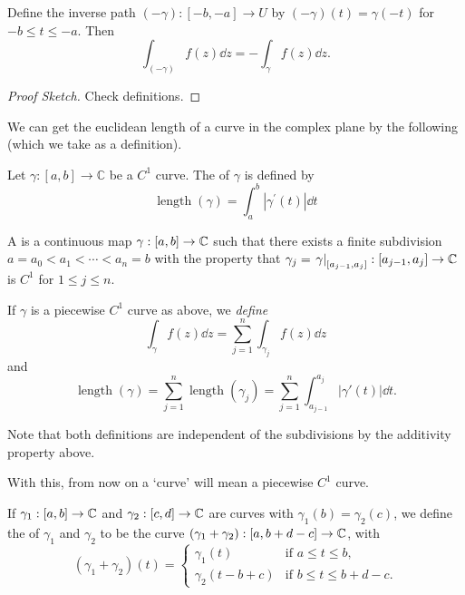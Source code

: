 \documentclass[a4paper]{scrartcl}
\begin{document}
\begin{proposition}
Define the inverse path $(-\gamma):[-b,-a] \rightarrow U$ by $(-\gamma)(t)=\gamma(-t)$ for $-b \leq t \leq-a$. Then
$$
\int_{(-\gamma)} f(z) \dd z=-\int_{\gamma} f(z) \dd z .
$$
\end{proposition}
\begin{proof}[Proof Sketch]    
    Check definitions.
\end{proof}

We can get the euclidean length of a curve in the complex plane by the following (which we take as a definition).

\begin{definition}
Let $\gamma:[a, b] \rightarrow \mathbb{C}$ be a $C^{1}$ curve. The  of $\gamma$ is defined by
$$
\operatorname{length}(\gamma)=\int_{a}^{b}\left|\gamma^{\prime}(t)\right| \dd t
$$
\end{definition}

\begin{definition}
    A  is a continuous map $\gamma: [a, b] \rightarrow \mathbb{C}$ such that there exists a finite subdivision
    $a = a_0 < a_1 < \cdots < a_n = b$ with the property that $\gamma_j = \left.\gamma\right|_{[a_{j - 1}, a_j]}: [a_{j - 1}, a_j] \rightarrow \mathbb{C}$ is $C^1$ for $1 \leq j \leq n$.
\end{definition}

If $\gamma$ is a piecewise $C^1$ curve as above, we \emph{define}
$$
\int_\gamma f(z) \dd z = \sum_{j = 1}^n \int_{\gamma_j} f(z) \dd z
$$
and
$$
\operatorname{length}(\gamma) = \sum_{j = 1}^{n} \operatorname{length}(\gamma_j) = \sum_{j = 1}^n \int_{a_{j - 1}}^{a_j} |\gamma'(t)| \dd t.
$$

\begin{remark}
    Note that both definitions are independent of the subdivisions by the additivity property above.
\end{remark}

With this, from now on a `curve' will mean a piecewise $C^1$ curve.

\begin{definition}
    If $\gamma_1: [a, b] \rightarrow \mathbb{C}$ and $\gamma_2 : [c, d] \rightarrow \mathbb{C}$ are curves with $\gamma_1(b) = \gamma_2(c)$, we define the  of $\gamma_1$ and $\gamma_2$ to be the curve $(\gamma_1 + \gamma_2): [a, b + d - c] \rightarrow \mathbb{C}$, with
    $$
    (\gamma_1 + \gamma_2)(t) = \begin{cases}
        \gamma_1(t) &\mbox{if } a \leq t \leq b, \\
        \gamma_2(t - b + c) &\mbox{if } b \leq t \leq b + d - c.
       \end{cases}
    $$
\end{definition}
\end{document}
